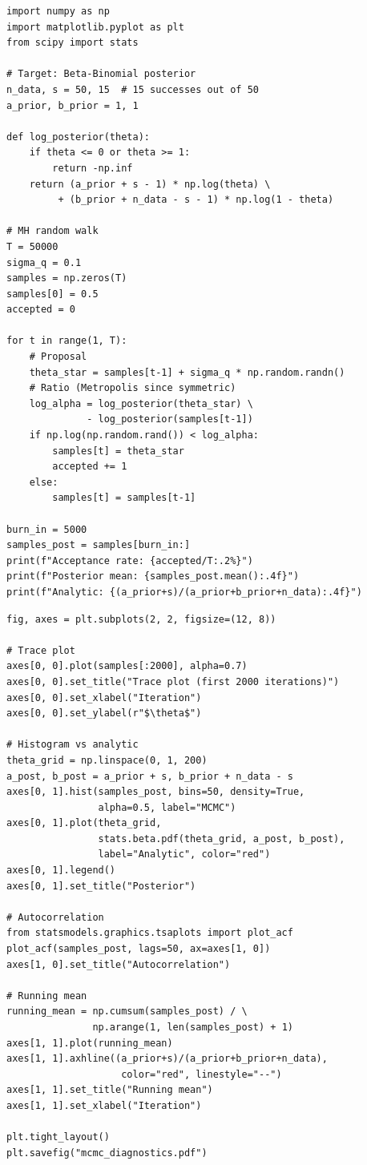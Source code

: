 \begin{codeblock}[title=\textbf{Metropolis--Hastings from scratch}]
\begin{verbatim}
import numpy as np
import matplotlib.pyplot as plt
from scipy import stats

# Target: Beta-Binomial posterior
n_data, s = 50, 15  # 15 successes out of 50
a_prior, b_prior = 1, 1

def log_posterior(theta):
    if theta <= 0 or theta >= 1:
        return -np.inf
    return (a_prior + s - 1) * np.log(theta) \
         + (b_prior + n_data - s - 1) * np.log(1 - theta)

# MH random walk
T = 50000
sigma_q = 0.1
samples = np.zeros(T)
samples[0] = 0.5
accepted = 0

for t in range(1, T):
    # Proposal
    theta_star = samples[t-1] + sigma_q * np.random.randn()
    # Ratio (Metropolis since symmetric)
    log_alpha = log_posterior(theta_star) \
              - log_posterior(samples[t-1])
    if np.log(np.random.rand()) < log_alpha:
        samples[t] = theta_star
        accepted += 1
    else:
        samples[t] = samples[t-1]

burn_in = 5000
samples_post = samples[burn_in:]
print(f"Acceptance rate: {accepted/T:.2%}")
print(f"Posterior mean: {samples_post.mean():.4f}")
print(f"Analytic: {(a_prior+s)/(a_prior+b_prior+n_data):.4f}")
\end{verbatim}
\end{codeblock}

\begin{codeblock}[title=\textbf{MCMC diagnostics}]
\begin{verbatim}
fig, axes = plt.subplots(2, 2, figsize=(12, 8))

# Trace plot
axes[0, 0].plot(samples[:2000], alpha=0.7)
axes[0, 0].set_title("Trace plot (first 2000 iterations)")
axes[0, 0].set_xlabel("Iteration")
axes[0, 0].set_ylabel(r"$\theta$")

# Histogram vs analytic
theta_grid = np.linspace(0, 1, 200)
a_post, b_post = a_prior + s, b_prior + n_data - s
axes[0, 1].hist(samples_post, bins=50, density=True,
                alpha=0.5, label="MCMC")
axes[0, 1].plot(theta_grid,
                stats.beta.pdf(theta_grid, a_post, b_post),
                label="Analytic", color="red")
axes[0, 1].legend()
axes[0, 1].set_title("Posterior")

# Autocorrelation
from statsmodels.graphics.tsaplots import plot_acf
plot_acf(samples_post, lags=50, ax=axes[1, 0])
axes[1, 0].set_title("Autocorrelation")

# Running mean
running_mean = np.cumsum(samples_post) / \
               np.arange(1, len(samples_post) + 1)
axes[1, 1].plot(running_mean)
axes[1, 1].axhline((a_prior+s)/(a_prior+b_prior+n_data),
                    color="red", linestyle="--")
axes[1, 1].set_title("Running mean")
axes[1, 1].set_xlabel("Iteration")

plt.tight_layout()
plt.savefig("mcmc_diagnostics.pdf")
\end{verbatim}
\end{codeblock}

